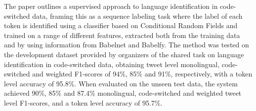 The paper outlines a supervised approach to language identification in code-switched data, framing this as a sequence labeling task where the label of each token is identified using a classifier based on Conditional Random Fields and trained on a range of different features, extracted both from the training data and by using information from Babelnet and Babelfy. The method was tested on the development dataset provided by organizers of the shared task on language identification in code-switched data, obtaining tweet level monolingual, code-switched and weighted F1-scores of 94\%, 85\% and 91\%, respectively, with a token level accuracy of 95.8\%. When evaluated on the unseen test data, the system achieved 90\%, 85\% and 87.4\% monolingual, code-switched and weighted tweet level F1-scores, and a token level accuracy of 95.7\%.
